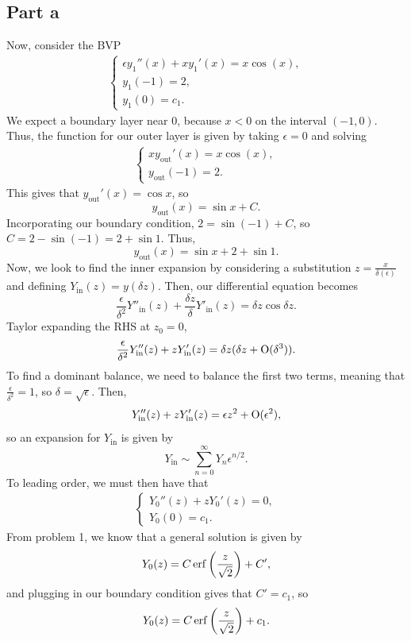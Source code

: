 \documentclass{article}
\begin{document}
\subsection{Part a}
Now, consider the BVP 
\begin{align*}
    \begin{cases} \epsilon y_1''(x) + x y_1'(x) = x \cos(x),\\
      y_1(-1) = 2,\\
      y_1(0) = c_1. \end{cases}
  \end{align*}
We expect a boundary layer near 0, because $x<0$ on the interval $(-1,0)$. Thus, the function for our outer layer is given by taking $\epsilon=0$ and solving
\begin{align*}
    \begin{cases} x y_{\text{out}}'(x) = x \cos(x),\\
      y_{\text{out}}(-1) = 2. \end{cases}
  \end{align*}
This gives that $y_{\text{out}}'(x)=\cos x$, so 
\[
y_{\text{out}}(x)=\sin x+C.
\]
Incorporating our boundary condition, $2=\sin(-1)+C$, so $C=2-\sin(-1)=2+\sin1$. Thus,
\[
y_{\text{out}}(x)=\sin x+2+\sin1.
\]
Now, we look to find the inner expansion by considering a substitution $z=\frac{x}{\delta(\epsilon)}$ and defining $Y_{\text{in}}(z)=y(\delta z)$. Then, our differential equation becomes 
\[
\frac{\epsilon}{\delta^2}Y''_{\text{in}}(z)+\frac{\delta z}{\delta}Y'_{\text{in}}(z)=\delta z\cos{\delta z}.
\]
Taylor expanding the RHS at $z_0=0$,
\[
\frac{\epsilon}{\delta^2}Y''_{\text{in}}(z)+zY'_{\text{in}}(z)=\delta z(\delta z+\operatorname{O}(\delta^3)).
\]
To find a dominant balance, we need to balance the first two terms, meaning that $\frac{\epsilon}{\delta^2}=1$, so $\delta=\sqrt{\epsilon}$. Then, 
\[
Y''_{\text{in}}(z)+zY'_{\text{in}}(z)=\epsilon z^2+\operatorname{O}(\epsilon^2),
\]
so an expansion for $Y_{\text{in}}$ is given by 
\[
Y_{\text{in}}\sim\sum_{n=0}^\infty Y_n\epsilon^{n/2}.
\]
To leading order, we must then have that 
\begin{align*}
    \begin{cases} Y_0''(z)+zY_0'(z) = 0,\\
      Y_0(0) = c_1. \end{cases}
  \end{align*}
From problem 1, we know that a general solution is given by
\[
Y_0(z)=C\operatorname{erf}\left(\frac{z}{\sqrt{2}}\right)+C',
\]
and plugging in our boundary condition gives that $C'=c_1$, so
\[
Y_0(z)=C\operatorname{erf}\left(\frac{z}{\sqrt{2}}\right)+c_1.
\]
\end{document}
